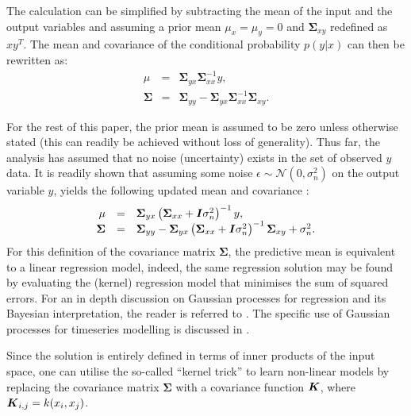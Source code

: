 \documentclass[useAMS,usenatbib,fleqn]{mn2e}
\begin{document}
The calculation can be simplified by subtracting the mean of the input and the output variables and assuming a prior mean $\mu_{x}=\mu_{y}=0$ and $\mathbf\Sigma_{xy}$ redefined as $xy^{T}$. The mean and covariance of the conditional probability $p(y|x)$ can then be rewritten as:
\begin{equation}
\label{eq-conditional-zero-mean}
\begin{array}{rcl}
\mu 		&=&		\mathbf\Sigma_{yx}\mathbf\Sigma_{xx}^{-1}y,\\
\mathbf\Sigma 	&=& 	\mathbf\Sigma_{yy}-\mathbf\Sigma_{yx}\mathbf\Sigma_{xx}^{-1}\mathbf\Sigma_{xy}.
\end{array}
\end{equation}

For the rest of this paper, the prior mean is assumed to be zero unless otherwise stated (this can readily be achieved without loss of generality). Thus far, the analysis has assumed that no noise (uncertainty) exists in the set of observed $y$ data. It is readily shown that assuming some noise $\epsilon \sim \mathcal{N}\left(0,\sigma_{n}^{2}\right)$ on the output variable $y$, yields the following updated mean and covariance \citep{rasmussen2006gaussian}:
\begin{equation}
\label{eq-mean-variance-noise}
\begin{array}{rcl}
\mu &=& \mathbf\Sigma_{yx}\left(\mathbf\Sigma_{xx}+\bmath{I}\sigma_{n}^{2}\right)^{-1}y,\\
\mathbf\Sigma &=& \mathbf\Sigma_{yy}-\mathbf\Sigma_{yx}\left(\mathbf\Sigma_{xx}+\bmath{I}\sigma_{n}^{2}\right)^{-1}\mathbf\Sigma_{xy}+\sigma_{n}^{2}.
\end{array}
\end{equation}
For this definition of the covariance matrix $\mathbf\Sigma$, the predictive mean is equivalent to a linear regression model, indeed, the same regression solution may be found by evaluating the (kernel) regression model that minimises the sum of squared errors. For an in depth discussion on Gaussian processes for regression and its Bayesian interpretation, the reader is referred to \citep{rasmussen2006gaussian}. The specific use of Gaussian processes for timeseries modelling is discussed in \citep{roberts2012rs}.

Since the solution is entirely defined in terms of inner products of the input space, one can utilise the so-called ``kernel trick'' to learn non-linear models by replacing the covariance matrix $\mathbf\Sigma$ with a covariance function $\bmath{K}$, where $\bmath{K}_{i,j} = k(x_{i},x_{j})$.
\end{document}
